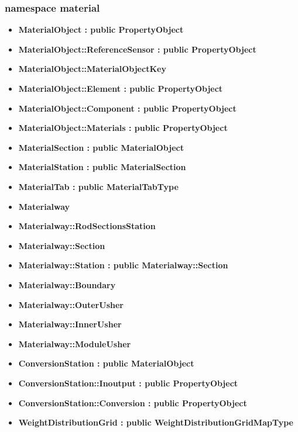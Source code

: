 \documentclass[12pt, a4paper]{article}
\begin{document}
\subsubsection{namespace material}

\begin{itemize}

\item \textbf{MaterialObject : public PropertyObject}
\item \textbf{MaterialObject::ReferenceSensor : public PropertyObject}
\item \textbf{MaterialObject::MaterialObjectKey}
\item \textbf{MaterialObject::Element : public PropertyObject}
\item \textbf{MaterialObject::Component : public PropertyObject}
\item \textbf{MaterialObject::Materials : public PropertyObject}
\item \textbf{MaterialSection : public MaterialObject}
\item \textbf{MaterialStation : public MaterialSection}
\item \textbf{MaterialTab : public MaterialTabType}
\item \textbf{Materialway}
\item \textbf{Materialway::RodSectionsStation}
\item \textbf{Materialway::Section}
\item \textbf{Materialway::Station : public Materialway::Section}
\item \textbf{Materialway::Boundary}
\item \textbf{Materialway::OuterUsher}
\item \textbf{Materialway::InnerUsher}
\item \textbf{Materialway::ModuleUsher}
\item \textbf{ConversionStation : public MaterialObject}
\item \textbf{ConversionStation::Inoutput : public PropertyObject}
\item \textbf{ConversionStation::Conversion : public PropertyObject}
\item \textbf{WeightDistributionGrid : public WeightDistributionGridMapType}

\end{itemize}
\end{document}
